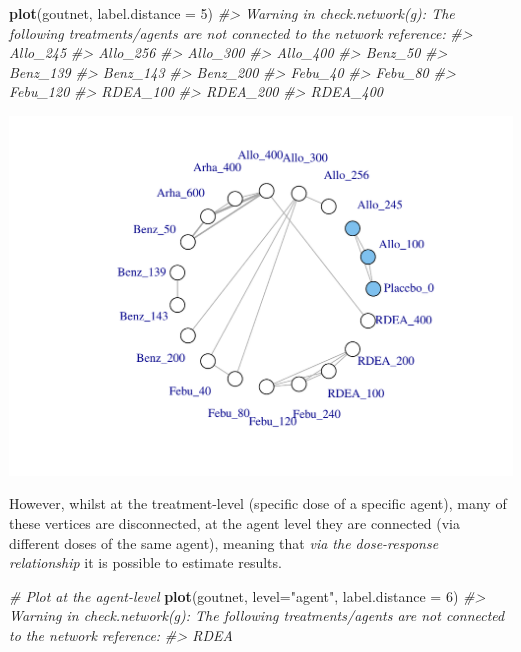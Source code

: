 \documentclass[]{article}
\newenvironment{Shaded}{\begin{snugshade}}{\end{snugshade}}
\newcommand{\CommentTok}[1]{\textcolor[rgb]{0.56,0.35,0.01}{\textit{#1}}}
\newcommand{\DataTypeTok}[1]{\textcolor[rgb]{0.13,0.29,0.53}{#1}}
\newcommand{\DecValTok}[1]{\textcolor[rgb]{0.00,0.00,0.81}{#1}}
\newcommand{\KeywordTok}[1]{\textcolor[rgb]{0.13,0.29,0.53}{\textbf{#1}}}
\newcommand{\NormalTok}[1]{#1}
\newcommand{\StringTok}[1]{\textcolor[rgb]{0.31,0.60,0.02}{#1}}
\begin{document}
\begin{Shaded}
\begin{Highlighting}[]
\KeywordTok{plot}\NormalTok{(goutnet, }\DataTypeTok{label.distance =} \DecValTok{5}\NormalTok{)}
\CommentTok{#> Warning in check.network(g): The following treatments/agents are not connected to the network reference:}
\CommentTok{#> Allo_245}
\CommentTok{#> Allo_256}
\CommentTok{#> Allo_300}
\CommentTok{#> Allo_400}
\CommentTok{#> Benz_50}
\CommentTok{#> Benz_139}
\CommentTok{#> Benz_143}
\CommentTok{#> Benz_200}
\CommentTok{#> Febu_40}
\CommentTok{#> Febu_80}
\CommentTok{#> Febu_120}
\CommentTok{#> RDEA_100}
\CommentTok{#> RDEA_200}
\CommentTok{#> RDEA_400}
\end{Highlighting}
\end{Shaded}

\includegraphics{mbnmadose_files/figure-latex/unnamed-chunk-8-1.pdf}

However, whilst at the treatment-level (specific dose of a specific
agent), many of these vertices are disconnected, at the agent level they
are connected (via different doses of the same agent), meaning that
\emph{via the dose-response relationship} it is possible to estimate
results.

\begin{Shaded}
\begin{Highlighting}[]
\CommentTok{# Plot at the agent-level}
\KeywordTok{plot}\NormalTok{(goutnet, }\DataTypeTok{level=}\StringTok{"agent"}\NormalTok{, }\DataTypeTok{label.distance =} \DecValTok{6}\NormalTok{)}
\CommentTok{#> Warning in check.network(g): The following treatments/agents are not connected to the network reference:}
\CommentTok{#> RDEA}
\end{Highlighting}
\end{Shaded}
\end{document}

